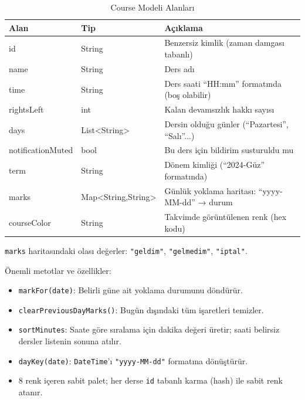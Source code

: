 \documentclass[12pt,a4paper]{article}
\begin{document}
\begin{table}[H]
    \centering
    \caption{Course Modeli Alanları}
    \label{tab:course}
    \renewcommand{\arraystretch}{1.3}
    \begin{tabularx}{\textwidth}{>{\ttfamily}l l X}
        \toprule
        \normalfont\textbf{Alan} & \textbf{Tip} & \textbf{Açıklama} \\
        \midrule
        id            & String              & Benzersiz kimlik (zaman damgası tabanlı) \\
        name          & String              & Ders adı \\
        time          & String              & Ders saati ``HH:mm'' formatında (boş olabilir) \\
        rightsLeft    & int                 & Kalan devamsızlık hakkı sayısı \\
        days          & List\textless String\textgreater  & Dersin olduğu günler (``Pazartesi'', ``Salı''...) \\
        notificationMuted & bool           & Bu ders için bildirim susturuldu mu \\
        term          & String              & Dönem kimliği (``2024-Güz'' formatında) \\
        marks         & Map\textless String,String\textgreater & Günlük yoklama haritası: ``yyyy-MM-dd'' → durum \\
        courseColor   & String              & Takvimde görüntülenen renk (hex kodu) \\
        \bottomrule
    \end{tabularx}
\end{table}

\texttt{marks} haritasındaki olası değerler: \texttt{"geldim"}, \texttt{"gelmedim"}, \texttt{"iptal"}.

Önemli metotlar ve özellikler:
\begin{itemize}
    \item \texttt{markFor(date)}: Belirli güne ait yoklama durumunu döndürür.
    \item \texttt{clearPreviousDayMarks()}: Bugün dışındaki tüm işaretleri temizler.
    \item \texttt{sortMinutes}: Saate göre sıralama için dakika değeri üretir; saati belirsiz dersler listenin sonuna atılır.
    \item \texttt{dayKey(date)}: \texttt{DateTime}'ı \texttt{"yyyy-MM-dd"} formatına dönüştürür.
    \item 8 renk içeren sabit palet; her derse \texttt{id} tabanlı karma (hash) ile sabit renk atanır.
\end{itemize}
\end{document}
